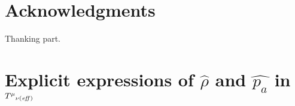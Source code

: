 \documentclass[preprint,aps,tightenlines,showkeys,nofootinbib,superscriptaddress,amsmath]{revtex4}
\newcommand{\m}{{\mu}}
\newcommand{\n}{{\nu}}
\begin{document}
\section*{Acknowledgments}

Thanking part.

\appendix

\section{Explicit expressions of $\widehat{\rho}$ and $\widehat{p_a}$ in
${T^{\m}}_{\n (\it{eff})}$
}

\newcommand{\J}[4]{#1 {\bf #2} #3 (#4)}
\newcommand{\andJ}[3]{{\bf #1} (#2) #3}
\newcommand{\AP}{Ann. Phys. (N.Y.)}
\newcommand{\MPL}{Mod. Phys. Lett.}
\newcommand{\NP}{Nucl. Phys.}
\newcommand{\PL}{Phys. Lett.}
\newcommand{\PR}{Phys. Rev. D}
\newcommand{\PRL}{Phys. Rev. Lett.}
\newcommand{\PTP}{Prog. Theor. Phys.}
\newcommand{\hep}[1]{ hep-th/{#1}}
\newcommand{\hepp}[1]{ hep-ph/{#1}}
\newcommand{\hepg}[1]{ gr-qc/{#1}}
\newcommand{\bi}{ \bibitem}
\end{document}
